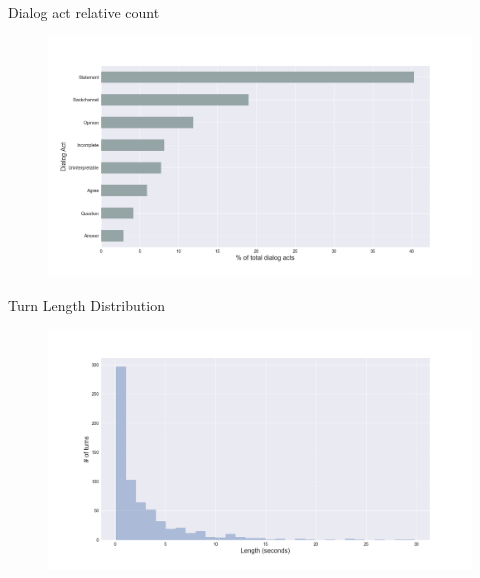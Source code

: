 \begin{frame}{Dialog act relative count}
\begin{figure}[ht!]
\centering
\includegraphics[width=36em]{../scikitlearn/figures/f1.png}\vspace{-1em}
\end{figure}
\end{frame}

\begin{frame}{Turn Length Distribution}
\begin{figure}[ht!]
\centering
\includegraphics[width=36em]{../scikitlearn/figures/f10.png}\vspace{-1em}
\end{figure}
\end{frame}



